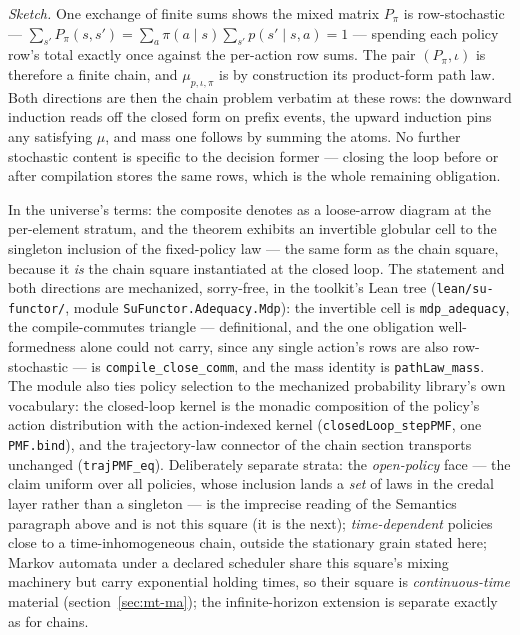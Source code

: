 \emph{Sketch.} One exchange of finite sums shows the mixed matrix
$P_\pi$ is row-stochastic --- $\sum_{s'} P_\pi(s, s') = \sum_a
\pi(a \mid s) \sum_{s'} p(s' \mid s, a) = 1$ --- spending each policy
row's total exactly once against the per-action row sums.  The pair
$(P_\pi, \iota)$ is therefore a finite chain, and $\mu_{p,\iota,\pi}$
is by construction its product-form path law.  Both directions are
then the chain problem verbatim at these rows: the downward induction
reads off the closed form on prefix events, the upward induction pins
any satisfying $\mu$, and mass one follows by summing the atoms.  No
further stochastic content is specific to the decision former ---
closing the loop before or after compilation stores the same rows,
which is the whole remaining obligation.

In the universe's terms: the composite denotes as a loose-arrow
diagram at the per-element stratum, and the theorem exhibits an
invertible globular cell to the singleton inclusion of the
fixed-policy law --- the same form as the chain square, because it
\emph{is} the chain square instantiated at the closed loop.  The
statement and both directions are mechanized, sorry-free, in the
toolkit's Lean tree (\texttt{lean/su-functor/}, module
\texttt{SuFunctor.Adequacy.Mdp}): the invertible cell is
\texttt{mdp\_adequacy}, the compile-commutes triangle ---
definitional, and the one obligation well-formedness alone could not
carry, since any single action's rows are also row-stochastic --- is
\texttt{compile\_close\_comm}, and the mass identity is
\texttt{pathLaw\_mass}.  The module also ties policy selection to the
mechanized probability library's own vocabulary: the closed-loop
kernel is the monadic composition of the policy's action distribution
with the action-indexed kernel (\texttt{closedLoop\_stepPMF}, one
\texttt{PMF.bind}), and the trajectory-law connector of the chain
section transports unchanged (\texttt{trajPMF\_eq}).  Deliberately
separate strata: the \emph{open-policy} face --- the claim uniform
over all policies, whose inclusion lands a \emph{set} of laws in the
credal layer rather than a singleton --- is the imprecise reading of
the Semantics paragraph above and is not this square (it is the
next);
\emph{time-dependent} policies close to a time-inhomogeneous chain,
outside the stationary grain stated here; Markov automata under a
declared scheduler share this square's mixing machinery but carry
exponential holding times, so their square is \emph{continuous-time}
material (section~\ref{sec:mt-ma}); the infinite-horizon
extension is separate exactly as for chains.

